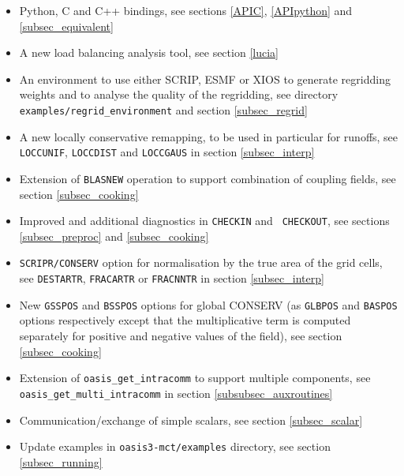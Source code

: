 \begin{itemize}

\item Python, C and C++ bindings, see sections \ref{APIC},
  \ref{APIpython} and \ref{subsec_equivalent}

\item A new  load balancing analysis tool, see section \ref{lucia}

\item An environment to use either SCRIP, ESMF or XIOS to
  generate regridding weights and to analyse the quality of the
  regridding, see directory {\tt
    examples/regrid\_environment} and section \ref{subsec_regrid}

 \item A new locally conservative remapping, to be used in particular
   for runoffs, see {\tt LOCCUNIF}, {\tt LOCCDIST} and {\tt LOCCGAUS} in section \ref{subsec_interp}

 \item Extension of {\tt BLASNEW} operation to support combination of
   coupling fields, see section \ref{subsec_cooking}

\item Improved and additional diagnostics in {\tt CHECKIN} and {\tt
    CHECKOUT}, see sections \ref{subsec_preproc}
  and \ref{subsec_cooking}

\item {\tt SCRIPR/CONSERV} option for normalisation by the true area of the grid cells,
  see {\tt DESTARTR}, {\tt FRACARTR} or {\tt FRACNNTR} in section
  \ref{subsec_interp}

\item New {\tt GSSPOS} and {\tt BSSPOS} options for global CONSERV (as
  {\tt GLBPOS} and {\tt BASPOS} options respectively except that the
  multiplicative term is computed separately for positive 
  and negative values of the field), see section \ref{subsec_cooking}

  \item Extension of {\tt oasis\_get\_intracomm} to support
  multiple components, see {\tt oasis\_get\_multi\_intracomm} in  section \ref{subsubsec_auxroutines} 

\item Communication/exchange of simple scalars, see section \ref{subsec_scalar}

\item Update examples in {\tt oasis3-mct/examples} directory, see
  section \ref{subsec_running}


\end{itemize}
